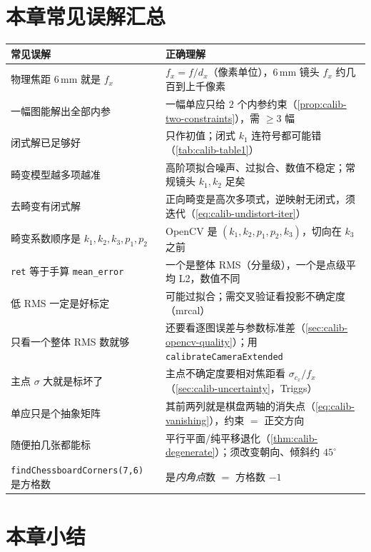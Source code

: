 \section*{本章常见误解汇总}
\begin{table}[ht]\centering\small
\begin{tabular}{p{} p{}}
\toprule
\textbf{常见误解} & \textbf{正确理解} \\
\midrule
物理焦距 $6\,\mathrm{mm}$ 就是 $f_x$ & $f_x=f/d_x$（像素单位），$6\,\mathrm{mm}$ 镜头 $f_x$ 约几百到上千像素 \\
一幅图能解出全部内参 & 一幅单应只给 $2$ 个内参约束（\cref{prop:calib-two-constraints}），需 $\ge3$ 幅 \\
闭式解已足够好 & 只作初值；闭式 $k_1$ 连符号都可能错（\cref{tab:calib-table1}）\\
畸变模型越多项越准 & 高阶项拟合噪声、过拟合、数值不稳定；常规镜头 $k_1,k_2$ 足矣 \\
去畸变有闭式解 & 正向畸变是高次多项式，逆映射无闭式，须迭代（\cref{eq:calib-undistort-iter}）\\
畸变系数顺序是 $k_1,k_2,k_3,p_1,p_2$ & OpenCV 是 $(k_1,k_2,p_1,p_2,k_3)$，切向在 $k_3$ 之前 \\
\texttt{ret} 等于手算 \texttt{mean\_error} & 一个是整体 RMS（分量级），一个是点级平均 L2，数值不同 \\
低 RMS 一定是好标定 & 可能过拟合；需交叉验证看投影不确定度（mrcal）\\
只看一个整体 RMS 数就够 & 还要看逐图误差与参数标准差（\cref{sec:calib-opencv-quality}）；用 \texttt{calibrateCameraExtended} \\
主点 $\sigma$ 大就是标坏了 & 主点不确定度要相对焦距看 $\sigma_{c_x}/f_x$（\cref{sec:calib-uncertainty}，Triggs）\\
单应只是个抽象矩阵 & 其前两列就是棋盘两轴的消失点（\cref{eq:calib-vanishing}），约束 $=$ 正交方向 \\
随便拍几张都能标 & 平行平面/纯平移退化（\cref{thm:calib-degenerate}）；须改变朝向、倾斜约 $45^\circ$ \\
\texttt{findChessboardCorners(7,6)} 是方格数 & 是\emph{内角点}数 $=$ 方格数 $-1$ \\
\bottomrule
\end{tabular}
\end{table}

\section*{本章小结}

